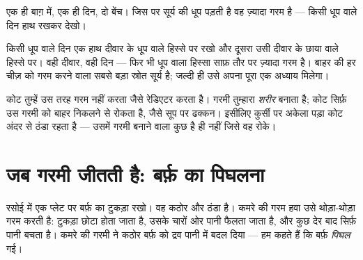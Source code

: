 \begin{omfigure}

{\small एक ही बाग़ में, एक ही दिन, दो बेंच। जिस पर सूर्य की धूप पड़ती
है वह ज़्यादा गरम है --- किसी धूप वाले दिन हाथ रखकर देखो।}
\end{omfigure}

\begin{example}[इसे करके देखो: धूप और छाया]\label{ex:g1:hot-and-cold:sunshade}
किसी धूप वाले दिन एक हाथ दीवार के धूप वाले हिस्से पर रखो और दूसरा उसी
दीवार के छाया वाले हिस्से पर। वही दीवार, वही दिन --- फिर भी धूप वाला
हिस्सा साफ़ तौर पर ज़्यादा गरम है। बाहर की हर चीज़ को गरम करने वाला
सबसे बड़ा स्रोत सूर्य है; जल्दी ही उसे अपना पूरा एक अध्याय मिलेगा।
\end{example}

\begin{remark}[कोट गरमी बनाता नहीं]\label{rem:g1:hot-and-cold:coat}
कोट तुम्हें उस तरह गरम नहीं करता जैसे रेडिएटर करता है। गरमी
तुम्हारा \emph{शरीर} बनाता है; कोट सिर्फ़ उस गरमी को बाहर निकलने से
रोकता है, जैसे सूप पर ढक्कन। इसीलिए कुर्सी पर अकेला पड़ा कोट अंदर से
ठंडा रहता है --- उसमें गरमी बनाने वाला कुछ है ही नहीं जिसे वह रोके।
\end{remark}

\section{जब गरमी जीतती है: बर्फ़ का पिघलना}

\begin{example}[बर्फ़ के एक टुकड़े की कहानी]\label{ex:g1:hot-and-cold:icecube}
रसोई में एक प्लेट पर बर्फ़ का टुकड़ा रखो। वह कठोर और ठंडा है। कमरे की
गरम हवा उसे थोड़ा-थोड़ा गरम करती है: टुकड़ा छोटा होता जाता है, उसके
चारों ओर पानी फैलता जाता है, और कुछ देर बाद सिर्फ़ पानी बचता है।
कमरे की गरमी ने कठोर बर्फ़ को द्रव पानी में बदल दिया --- हम कहते हैं
कि बर्फ़ \emph{पिघल} गई।
\end{example}

